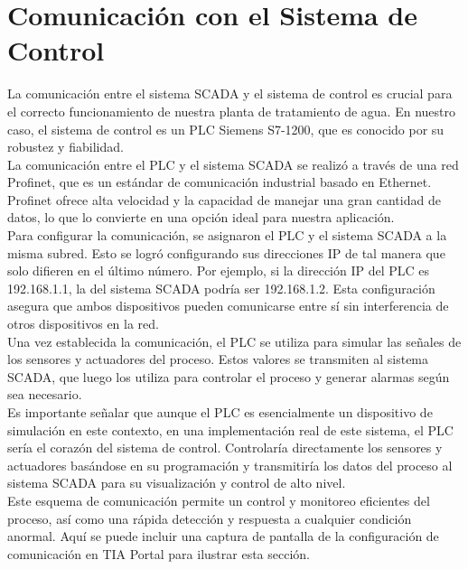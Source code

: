 \chapter{Comunicación con el Sistema de Control}

La comunicación entre el sistema SCADA y el sistema de control es crucial para el correcto funcionamiento de nuestra planta de tratamiento de agua. En nuestro caso, el sistema de control es un PLC Siemens S7-1200, que es conocido por su robustez y fiabilidad.\\

La comunicación entre el PLC y el sistema SCADA se realizó a través de una red Profinet, que es un estándar de comunicación industrial basado en Ethernet. Profinet ofrece alta velocidad y la capacidad de manejar una gran cantidad de datos, lo que lo convierte en una opción ideal para nuestra aplicación.\\

Para configurar la comunicación, se asignaron el PLC y el sistema SCADA a la misma subred. Esto se logró configurando sus direcciones IP de tal manera que solo difieren en el último número. Por ejemplo, si la dirección IP del PLC es 192.168.1.1, la del sistema SCADA podría ser 192.168.1.2. Esta configuración asegura que ambos dispositivos pueden comunicarse entre sí sin interferencia de otros dispositivos en la red.\\

Una vez establecida la comunicación, el PLC se utiliza para simular las señales de los sensores y actuadores del proceso. Estos valores se transmiten al sistema SCADA, que luego los utiliza para controlar el proceso y generar alarmas según sea necesario.\\

Es importante señalar que aunque el PLC es esencialmente un dispositivo de simulación en este contexto, en una implementación real de este sistema, el PLC sería el corazón del sistema de control. Controlaría directamente los sensores y actuadores basándose en su programación y transmitiría los datos del proceso al sistema SCADA para su visualización y control de alto nivel.\\

Este esquema de comunicación permite un control y monitoreo eficientes del proceso, así como una rápida detección y respuesta a cualquier condición anormal. Aquí se puede incluir una captura de pantalla de la configuración de comunicación en TIA Portal para ilustrar esta sección.\\
